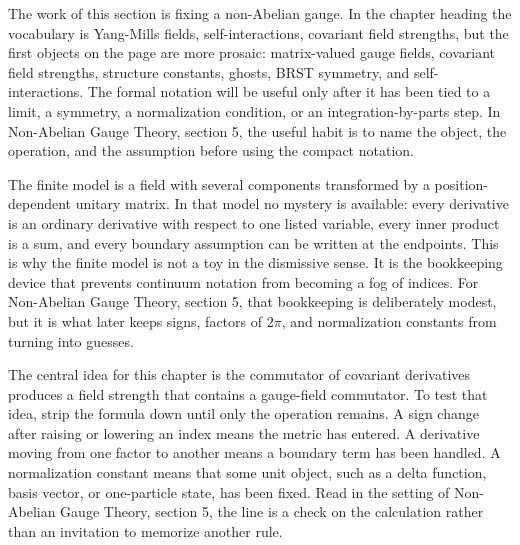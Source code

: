 











The work of this section is fixing a non-Abelian gauge.  In the chapter heading the vocabulary is Yang-Mills fields, self-interactions, covariant field strengths, but the first objects on the page are more prosaic: matrix-valued gauge fields, covariant field strengths, structure constants, ghosts, BRST symmetry, and self-interactions.  The formal notation will be useful only after it has been tied to a limit, a symmetry, a normalization condition, or an integration-by-parts step.  In Non-Abelian Gauge Theory, section 5, the useful habit is to name the object, the operation, and the assumption before using the compact notation.

The finite model is a field with several components transformed by a position-dependent unitary matrix.  In that model no mystery is available: every derivative is an ordinary derivative with respect to one listed variable, every inner product is a sum, and every boundary assumption can be written at the endpoints.  This is why the finite model is not a toy in the dismissive sense.  It is the bookkeeping device that prevents continuum notation from becoming a fog of indices.  For Non-Abelian Gauge Theory, section 5, that bookkeeping is deliberately modest, but it is what later keeps signs, factors of \(2\pi\), and normalization constants from turning into guesses.

The central idea for this chapter is the commutator of covariant derivatives produces a field strength that contains a gauge-field commutator.  To test that idea, strip the formula down until only the operation remains.  A sign change after raising or lowering an index means the metric has entered.  A derivative moving from one factor to another means a boundary term has been handled.  A normalization constant means that some unit object, such as a delta function, basis vector, or one-particle state, has been fixed.  Read in the setting of Non-Abelian Gauge Theory, section 5, the line is a check on the calculation rather than an invitation to memorize another rule.

